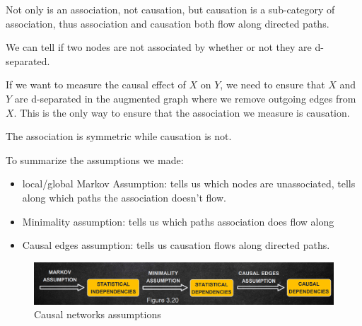 Not only is an association, not causation, but causation is a sub-category of association,
thus association and causation both flow along directed paths.

We can tell if two nodes are not associated by whether or not they are d-separated.

If we want to measure the causal effect of $X$ on $Y$, we need to ensure that $X$
and $Y$ are d-separated in the augmented graph where we remove outgoing edges
from $X$. This is the only way to ensure that the association we measure is causation.

\begin{note}
    The association is symmetric while causation is not.
\end{note}

To summarize the assumptions we made:
\begin{itemize}
    \item local/global Markov Assumption: tells us which nodes are unassociated,
          tells along which paths the association doesn't flow.
    \item Minimality assumption: tells us which paths association does flow along
    \item Causal edges assumption: tells us causation flows along directed paths.
\end{itemize}
\begin{figure}[!h]
    \centering
    \includegraphics*[width=\textwidth]{img/flow/causal_networks_assumptions.png}
    \caption{Causal networks assumptions}
    \label{fig:causal_networks_assumptions}
\end{figure}

